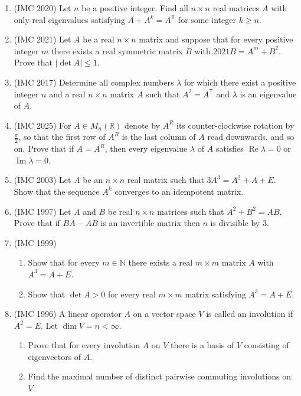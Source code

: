 \documentclass[11pt,a4paper]{article}
\newcommand{\T}{\mathsf T}
\begin{document}
\begin{enumerate}
\item (IMC 2020) Let $n$ be a positive integer. Find all $n\times n$ real matrices $A$ with only
real eigenvalues satisfying $A+A^k=A^\T$ for some integer $k\geqslant n$.

\item (IMC 2021) Let $A$ be a real $n\times n$ matrix and suppose that for every positive integer
$m$ there exists a real symmetric matrix $B$ with $2021B=A^m+B^2$. Prove that
$|\det A|\leqslant1$.

\item (IMC 2017) Determine all complex numbers $\lambda$ for which there exist a positive integer
$n$ and a real $n\times n$ matrix $A$ such that $A^2=A^\T$ and $\lambda$ is an eigenvalue of $A$.

\item (IMC 2025) For $A\in M_n(\mathbb R)$ denote by $A^R$ its counter-clockwise rotation by
$\frac\pi2$, so that the first row of $A^R$ is the last column of $A$ read downwards, and so on.
Prove that if $A=A^R$, then every eigenvalue $\lambda$ of $A$ satisfies $\operatorname{Re}\lambda=0$
or $\operatorname{Im}\lambda=0$.

\item (IMC 2003) Let $A$ be an $n\times n$ real matrix such that $3A^3=A^2+A+E$. Show that the
sequence $A^k$ converges to an idempotent matrix.

\item (IMC 1997) Let $A$ and $B$ be real $n\times n$ matrices such that $A^2+B^2=AB$. Prove that
if $BA-AB$ is an invertible matrix then $n$ is divisible by $3$.

\item (IMC 1999)
\begin{enumerate}[label=\alph*),align=left]
\item Show that for every $m\in\mathbb N$ there exists a real $m\times m$ matrix $A$ with
$A^3=A+E$.
\item Show that $\det A>0$ for every real $m\times m$ matrix satisfying $A^3=A+E$.
\end{enumerate}

\item (IMC 1996) A linear operator $A$ on a vector space $V$ is called an involution if $A^2=E$.
Let $\dim V=n<\infty$.
\begin{enumerate}[label=\alph*),align=left]
\item Prove that for every involution $A$ on $V$ there is a basis of $V$ consisting of
eigenvectors of $A$.
\item Find the maximal number of distinct pairwise commuting involutions on $V$.
\end{enumerate}


\end{enumerate}
\end{document}
